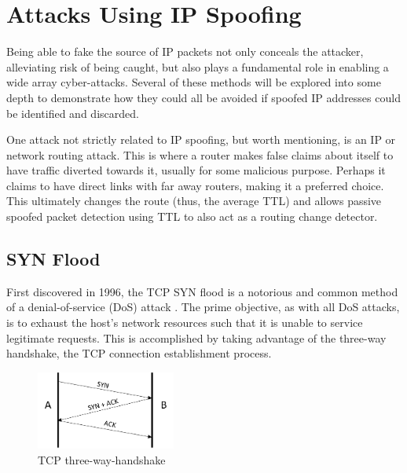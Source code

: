 \documentclass[twocolumn,10pt]{asme2ej}
\begin{document}
\section{Attacks Using IP Spoofing} \label{attacks}

Being able to fake the source of IP packets not only conceals the attacker, alleviating risk of being caught, but also plays a fundamental role in enabling a wide array cyber-attacks. Several of these methods will be explored into some depth to demonstrate how they could all be avoided if spoofed IP addresses could be identified and discarded.

One attack not strictly related to IP spoofing, but worth mentioning, is an IP or network routing attack. This is where a router makes false claims about itself to have traffic diverted towards it, usually for some malicious purpose. Perhaps it claims to have direct links with far away routers, making it a preferred choice. This ultimately changes the route (thus, the average TTL) and allows passive spoofed packet detection using TTL to also act as a routing change detector. 

\subsection{SYN Flood}
First discovered in 1996, the TCP SYN flood is a notorious and common method of a denial-of-service (DoS) attack \cite{rfc4987}. The prime objective, as with all DoS attacks, is to exhaust the host's network resources such that it is unable to service legitimate requests. This is accomplished by taking advantage of the three-way handshake, the TCP connection establishment process.

\begin{figure}[h]
	\begin{center}
		\includegraphics[width=4.57cm, height=2.57cm]{figures/three-way-handshake}
	\end{center}
	\caption{TCP three-way-handshake}
	\label{figure_handshake} 
\end{figure}
\end{document}
